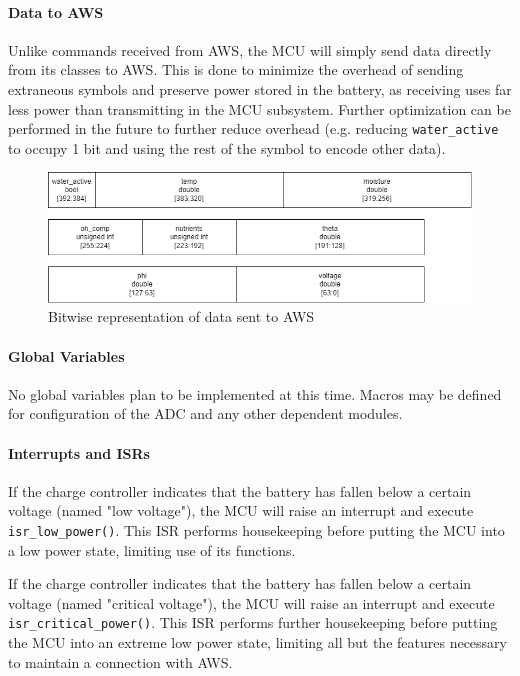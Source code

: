 \paragraph{Data to AWS}
Unlike commands received from AWS, the MCU will simply send data directly
from its classes to AWS. This is done to minimize the overhead of sending
extraneous symbols and preserve power stored in the battery, as receiving
uses far less power than transmitting in the MCU subsystem. Further
optimization can be performed in the future to further reduce overhead
(e.g. reducing \texttt{water\_active} to occupy 1 bit and using the rest of
the symbol to encode other data).
\begin{figure}[H]
    \caption{Bitwise representation of data sent to AWS}
    \label{toweb_encoding}
    \centering
    \includegraphics[width=\textwidth]{images/toweb_encoding.png}
\end{figure}

\paragraph{Global Variables}
No global variables plan to be implemented at this time. Macros may be
defined for configuration of the ADC and any other dependent modules.

\paragraph{Interrupts and ISRs}
If the charge controller indicates that the battery has fallen below a
certain voltage (named "low voltage"), the MCU will raise an interrupt and
execute \texttt{isr\_low\_power()}. This ISR performs housekeeping before
putting the MCU into a low power state, limiting use of its functions.

If the charge controller indicates that the battery has fallen below a
certain voltage (named "critical voltage"), the MCU will raise an interrupt
and execute \texttt{isr\_critical\_power()}. This ISR performs further 
housekeeping before putting the MCU into an extreme low power state,
limiting all but the features necessary to maintain a connection with AWS.

